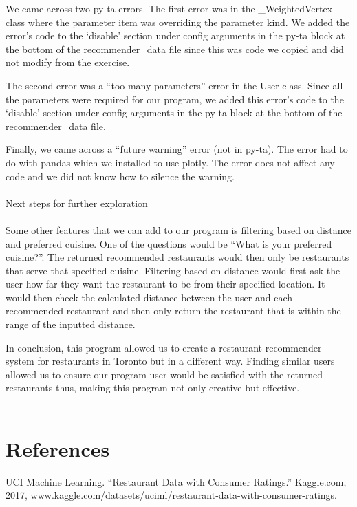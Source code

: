 \documentclass{article}
\begin{document}
We came across two py-ta errors. The first error was in the \_WeightedVertex class where the parameter item was overriding the parameter kind. We added the error’s code to the ‘disable’ section under config arguments in the py-ta block at the bottom of the recommender\_data file since this was code we copied and did not modify from the exercise. 


The second error was a “too many parameters” error in the User class. Since all the parameters were required for our program, we added this error’s code to the ‘disable’ section under config arguments in the py-ta block at the bottom of the recommender\_data file.


Finally, we came across a “future warning” error (not in py-ta). The error had to do with pandas which we installed to use plotly. The error does not affect any code and we did not know how to silence the warning. 
\\\\

Next steps for further exploration
\\\\

Some other features that we can add to our program is filtering based on distance and preferred cuisine. One of the questions would be “What is your preferred cuisine?”. The returned recommended restaurants would then only be restaurants that serve that specified cuisine. Filtering based on distance would first ask the user how far they want the restaurant to be from their specified location. It would then check the calculated distance between the user and each recommended restaurant and then only return the restaurant that is within the range of the inputted distance.


In conclusion, this program allowed us to create a restaurant recommender system for restaurants in Toronto but in a different way. Finding similar users allowed us to ensure our program user would be satisfied with the returned restaurants thus, making this program not only creative but effective. 
\\\\

\section{References}
UCI Machine Learning. “Restaurant Data with Consumer Ratings.” Kaggle.com, 2017, www.kaggle.com/datasets/uciml/restaurant-data-with-consumer-ratings.‌
\end{document}
